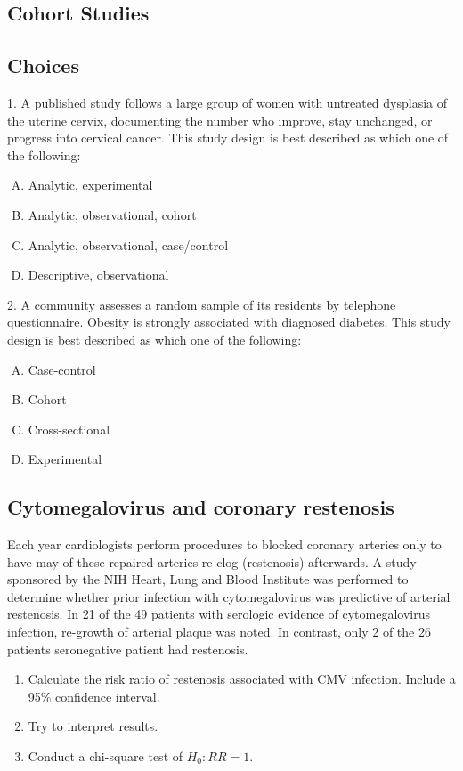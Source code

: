 \documentclass[11pt,a4paper]{article}
\begin{document}
\begin{CJK*}{UTF8}{gbsn}
\section{Cohort Studies}

\subsection{Choices}

1. A published study follows a large group of women with untreated dysplasia of 
the uterine cervix, documenting the number who improve, stay unchanged, or progress 
into cervical cancer. This study design is best described as which one of the 
following:
\begin{enumerate}[(A)]
  \item Analytic, experimental
  \item Analytic, observational, cohort
  \item Analytic, observational, case/control
  \item Descriptive, observational
\end{enumerate}


2. A community assesses a random sample of its residents by telephone questionnaire. 
Obesity is strongly associated with diagnosed diabetes. This study design is best 
described as which one of the following:
\begin{enumerate}[(A)]
  \item Case-control
  \item Cohort
  \item Cross-sectional
  \item Experimental
\end{enumerate}


\subsection{Cytomegalovirus and coronary restenosis}
Each year cardiologists perform procedures to blocked coronary arteries only to 
have may of these repaired arteries re-clog (restenosis) afterwards. A study 
sponsored by the NIH Heart, Lung and Blood Institute was performed to determine 
whether prior infection with cytomegalovirus was predictive of arterial restenosis. 
In 21 of the 49 patients with serologic evidence of cytomegalovirus infection, 
re-growth of arterial plaque was noted. In contrast, only 2 of the 26 patients 
seronegative patient had restenosis. 
\begin{enumerate}[(1)]
	\item Calculate the risk ratio of restenosis associated with CMV infection. 
		Include a 95\% confidence interval.
	\item Try to interpret results.
	\item Conduct a chi-square test of $H_0: RR = 1$.
\end{enumerate}

\end{CJK*}
\end{document}
